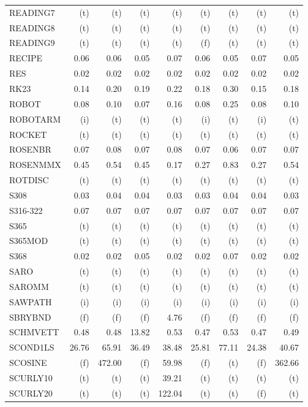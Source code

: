 \documentclass[11pt,twoside]{article}
\begin{document}
{\begin{longtable}[c]{|l|r|r|r|r|r|r|r|r|}
READING7 & (t) & (t) & (t) & (t) & (t) & (t) & (t) & (t) \\
READING8 & (t) & (t) & (t) & (t) & (t) & (t) & (t) & (t) \\
READING9 & (t) & (t) & (t) & (t) & (f) & (t) & (t) & (t) \\
RECIPE & 0.06 & 0.06 & 0.05 & 0.07 & 0.06 & 0.05 & 0.07 & 0.05 \\
RES & 0.02 & 0.02 & 0.02 & 0.02 & 0.02 & 0.02 & 0.02 & 0.02 \\
RK23 & 0.14 & 0.20 & 0.19 & 0.22 & 0.18 & 0.30 & 0.15 & 0.18 \\
ROBOT & 0.08 & 0.10 & 0.07 & 0.16 & 0.08 & 0.25 & 0.08 & 0.10 \\
ROBOTARM & (i) & (t) & (t) & (t) & (i) & (t) & (i) & (t) \\
ROCKET & (t) & (t) & (t) & (t) & (t) & (t) & (t) & (t) \\
ROSENBR & 0.07 & 0.08 & 0.07 & 0.08 & 0.07 & 0.06 & 0.07 & 0.07 \\
ROSENMMX & 0.45 & 0.54 & 0.45 & 0.17 & 0.27 & 0.83 & 0.27 & 0.54 \\
ROTDISC & (t) & (t) & (t) & (t) & (t) & (t) & (t) & (t) \\
S308 & 0.03 & 0.04 & 0.04 & 0.03 & 0.03 & 0.04 & 0.04 & 0.03 \\
S316-322 & 0.07 & 0.07 & 0.07 & 0.07 & 0.07 & 0.07 & 0.07 & 0.07 \\
S365 & (t) & (t) & (t) & (t) & (t) & (t) & (t) & (t) \\
S365MOD & (t) & (t) & (t) & (t) & (t) & (t) & (t) & (t) \\
S368 & 0.02 & 0.02 & 0.05 & 0.02 & 0.02 & 0.07 & 0.02 & 0.02 \\
SARO & (t) & (t) & (t) & (t) & (t) & (t) & (t) & (t) \\
SAROMM & (t) & (t) & (t) & (t) & (t) & (t) & (t) & (t) \\
SAWPATH & (i) & (i) & (i) & (i) & (i) & (i) & (i) & (i) \\
SBRYBND & (f) & (f) & (f) & 4.76 & (f) & (f) & (f) & (f) \\
SCHMVETT & 0.48 & 0.48 & 13.82 & 0.53 & 0.47 & 0.53 & 0.47 & 0.49 \\
SCOND1LS & 26.76 & 65.91 & 36.49 & 38.48 & 25.81 & 77.11 & 24.38 & 40.67 \\
SCOSINE & (f) & 472.00 & (f) & 59.98 & (f) & (t) & (f) & 362.66 \\
SCURLY10 & (t) & (t) & (t) & 39.21 & (t) & (t) & (t) & (t) \\
SCURLY20 & (t) & (t) & (t) & 122.04 & (t) & (t) & (f) & (t) \\

\end{longtable}}
\end{document}
